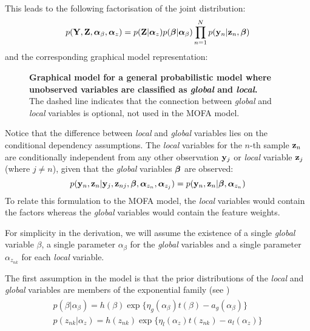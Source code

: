 This leads to the following factorisation of the joint distribution:
\begin{equation}
	p({\bf Y}, {\bf Z}, \mbox{\boldmath $\alpha$}_{\beta}, \mbox{\boldmath $\alpha$}_{z}) = p({\bf Z}|\mbox{\boldmath $\alpha$}_{z}) p(\mbox{\boldmath $\beta$}|\mbox{\boldmath $\alpha$}_{\beta}) \prod_{n=1}^{N} p({\bf y}_{n}|{\bf z}_{n},\mbox{\boldmath $\beta$})
\end{equation}
and the corresponding graphical model representation:
\begin{figure}[H]
	\centering	
	
	\caption{\textbf{Graphical model for a general probabilistic model where unobserved variables are classified as \textit{global} and \textit{local}.}\\
	The dashed line indicates that the connection between \textit{global} and \textit{local} variables is optional, not used in the MOFA model.
	}
	\label{fig:graphical_model_stochastic}
\end{figure}

Notice that the difference between \textit{local} and \textit{global} variables lies on the conditional dependency assumptions. The \textit{local} variables for the $n$-th sample ${\bf z}_n$ are conditionally independent from any other observation ${\bf y}_{j}$ or \textit{local} variable ${\bf z}_{j}$ (where $j \neq n$), given that the \textit{global} variables $\mbox{\boldmath $\beta$}$ are observed:
\[
	p({\bf y}_n,{\bf z}_n| {\bf y}_j,{\bf z}_{nj},\mbox{\boldmath $\beta$},\mbox{\boldmath $\alpha$}_{z_{n}},\mbox{\boldmath $\alpha$}_{z_{j}}) = p({\bf y}_n,{\bf z}_n|\mbox{\boldmath $\beta$},\mbox{\boldmath $\alpha$}_{z_{n}})
\]
To relate this formulation to the MOFA model, the \textit{local} variables would contain the factors whereas the \textit{global} variables would contain the feature weights.

For simplicity in the derivation, we will assume the existence of a single \textit{global} variable $\beta$, a single parameter $\alpha_{\beta}$ for the \textit{global} variables and a single parameter $\alpha_{z_{nk}}$ for each \textit{local} variable.

The first assumption in the model is that the prior distributions of the \textit{local} and \textit{global} variables are members of the exponential family (see )
\begin{align} \label{eq_priors} 
	\begin{split}
	p(\beta|\alpha_{\beta}) = h(\beta) \exp\{ \eta_g(\alpha_{\beta}) t(\beta) - a_g(\alpha_{\beta}) \} \\
	p(z_{nk}|\alpha_{z}) = h(z_{nk}) \exp\{ \eta_l(\alpha_{z}) t(z_{nk}) - a_l(\alpha_{z}) \}
	\end{split} 
\end{align}

